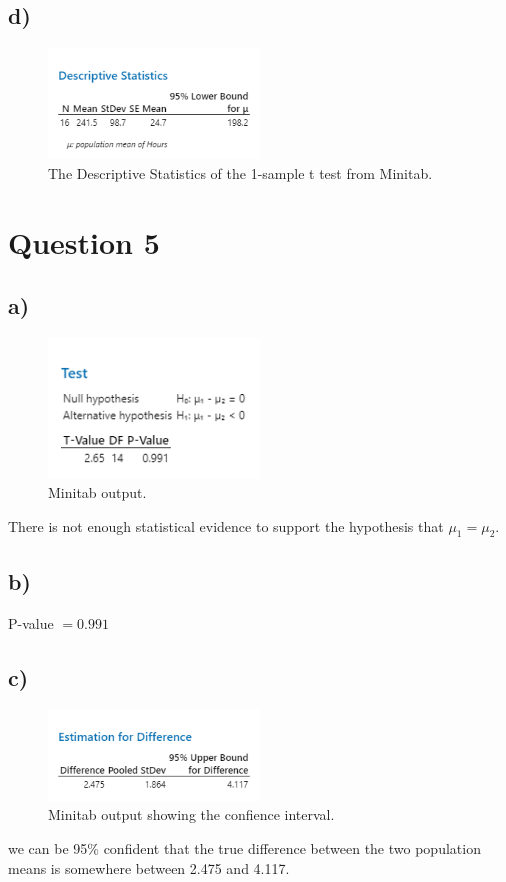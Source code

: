 \documentclass{article}
\begin{document}
\subsection*{d)}
\begin{figure}[h]
    \centering
    \includegraphics[width=0.5\textwidth]{./hw_1/images/4_a.png}
    \caption{The Descriptive Statistics of the 1-sample t test from Minitab.}
    \label{fig:4_b}
  \end{figure}


\clearpage
\section*{Question 5}

\subsection*{a)}
\begin{figure}[h]
    \centering
    \includegraphics[width=0.5\textwidth]{./hw_1/images/5_a.png}
    \caption{Minitab output.}
    \label{fig:4_a}
\end{figure}
There is not enough statistical evidence to support the hypothesis that $\mu_1 = \mu_2$.
\subsection*{b)}
P-value $= 0.991$
\subsection*{c)}
\begin{figure}[h]
    \centering
    \includegraphics[width=0.5\textwidth]{./hw_1/images/5_b.png}
    \caption{Minitab output showing the confience interval.}
    \label{fig:4_a}
\end{figure}
we can be 95\% confident that the true difference between the two population means is somewhere between 2.475 and 4.117.
\clearpage
\end{document}
